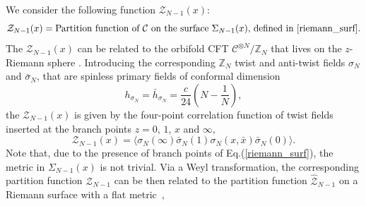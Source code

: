\documentclass[a4paper,11pt]{article}
\begin{document}
\noindent We consider the following function $\mathcal{Z}_{N-1}(x)$:
\begin{equation}
\mathcal{Z}_{N-1}(x)=\text{Partition function of $\mathcal{C}$ on the surface  $\Sigma_{N-1}(x)$, defined in \eqref{riemann_surf}}.
 \end{equation}
The $\mathcal{Z}_{N-1}(x)$ can be related to the orbifold CFT $\mathcal{C}^{\otimes N}/\mathbb{Z}_N$ that lives on the $z$-Riemann sphere \cite{Dixon, Knizhnik}. Introducing  the corresponding $\mathbb{Z}_N$ twist and anti-twist fields $\sigma_N$ and $\bar{\sigma}_N$, that are  spinless primary fields of conformal dimension~\cite{Knizhnik}
\begin{equation}
 h_{\sigma_N}=\bar{h}_{\sigma_N}=\frac{c}{24}\left(N-\frac{1}{N}\right),
\end{equation}
the $\mathcal{Z}_{N-1}(x)$ is given by the four-point correlation function of twist fields inserted at the branch points $z=0$, $1$, $x$ and $\infty$,
\begin{equation}
\label{geom_inter}
\mathcal{Z}_{N-1}(x)=\langle \sigma_N (\infty) \bar{\sigma}_N(1)\sigma_N(x,\bar{x}) \bar{\sigma}_N(0)\rangle.
 \end{equation}
Note that, due to the presence of branch points of Eq.(\ref{riemann_surf}), the metric in $\Sigma_{N-1}(x)$ is not trivial.  Via a Weyl transformation, the corresponding partition function $\mathcal{Z}_{N-1}$ can be then related to the partition function $\mathcal{\hat{Z}}_{N-1}$ on a Riemann surface with a flat metric~\cite{Lunin},  
\end{document}

